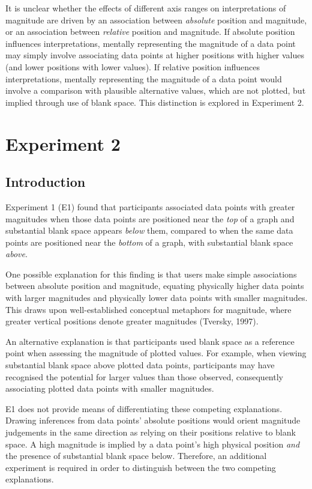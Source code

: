 \documentclass[journal]{vgtc}                %
\begin{document}
It is unclear whether the effects of different axis ranges on interpretations of magnitude are driven by an association between \emph{absolute} position and magnitude, or an association between \emph{relative} position and magnitude. If absolute position influences interpretations, mentally representing the magnitude of a data point may simply involve associating data points at higher positions with higher values (and lower positions with lower values). If relative position influences interpretations, mentally representing the magnitude of a data point would involve a comparison with plausible alternative values, which are not plotted, but implied through use of blank space. This distinction is explored in Experiment 2.

\hypertarget{experiment-2}{%
\section{Experiment 2}\label{experiment-2}}

\hypertarget{introduction-2}{%
\subsection{Introduction}\label{introduction-2}}

Experiment 1 (E1) found that participants associated data points with greater magnitudes when those data points are positioned near the \emph{top} of a graph and substantial blank space appears \emph{below} them, compared to when the same data points are positioned near the \emph{bottom} of a graph, with substantial blank space \emph{above}.

One possible explanation for this finding is that users make simple associations between absolute position and magnitude, equating physically higher data points with larger magnitudes and physically lower data points with smaller magnitudes. This draws upon well-established conceptual metaphors for magnitude, where greater vertical positions denote greater magnitudes (Tversky, 1997).

An alternative explanation is that participants used blank space as a reference point when assessing the magnitude of plotted values. For example, when viewing substantial blank space above plotted data points, participants may have recognised the potential for larger values than those observed, consequently associating plotted data points with smaller magnitudes.

E1 does not provide means of differentiating these competing explanations. Drawing inferences from data points' absolute positions would orient magnitude judgements in the same direction as relying on their positions relative to blank space. A high magnitude is implied by a data point's high physical position \emph{and} the presence of substantial blank space below. Therefore, an additional experiment is required in order to distinguish between the two competing explanations.~
\end{document}
